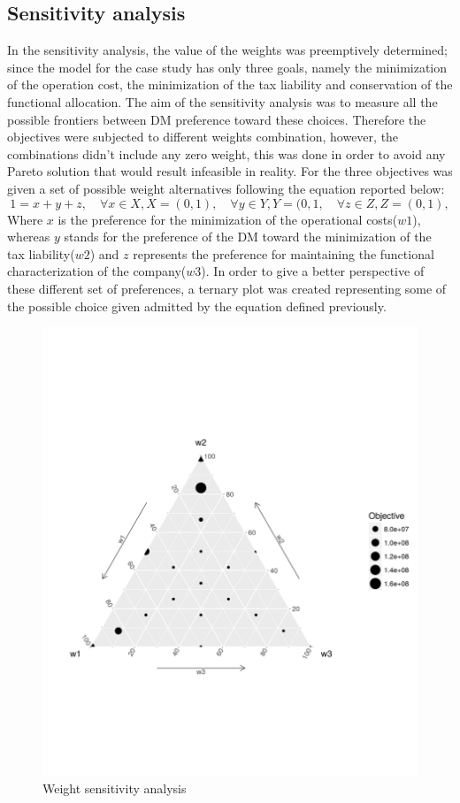 \begin{doublespace}
\subsection{Sensitivity analysis}
In the sensitivity analysis, the value of the weights was preemptively determined; since the model for the case study has only three goals, namely the minimization of the operation cost, the minimization of the tax liability and conservation of the functional allocation. The aim of the sensitivity analysis was to measure all the possible frontiers between DM preference toward these choices. Therefore the objectives were subjected to different weights combination, however, the combinations didn't include any zero weight, this was done in order to avoid any Pareto solution that would result infeasible in reality. For the three objectives was given a set of possible weight alternatives following the equation reported below:
$$
1=x + y + z, \quad \forall x \in X, X = (0,1), \quad \forall y \in Y, Y = (0,1, \quad \forall z \in Z, Z = (0,1),
$$
Where $x$ is the preference for the minimization of the operational costs($w1$), whereas $y$ stands for the preference of the DM toward the minimization of the tax liability($w2$) and $z$ represents the preference for maintaining the functional characterization of the company($w3$).
In order to give a better perspective of these different set of preferences, a ternary plot was created representing some of the possible choice given admitted by the equation defined previously.

\begin{figure}[h]
\centering
\includegraphics[width=0.7\linewidth]{Images/ternary.png}
\caption{Weight sensitivity analysis}
\end{figure}


\end{doublespace}
